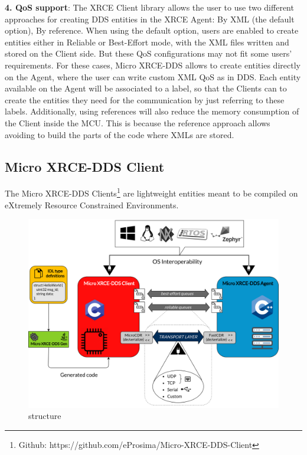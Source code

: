 \textbf{4. QoS support}: The XRCE Client library allows the user to use two different approaches for creating DDS entities in the XRCE Agent: By XML (the default option), By reference. When using the default option, users are enabled to create entities either in Reliable or Best-Effort mode, with the XML files written and stored on the Client side. But these QoS configurations may not fit some users’ requirements. For these cases, Micro XRCE-DDS allows to create entities directly on the Agent, where the user can write custom XML QoS as in DDS. Each entity available on the Agent will be associated to a label, so that the Clients can to create the entities they need for the communication by just referring to these labels. Additionally, using references will also reduce the memory consumption of the Client inside the MCU. This is because the reference approach allows avoiding to build the parts of the code where XMLs are stored.

\subsection{Micro XRCE-DDS Client}
The Micro XRCE-DDS Clients\footnote{Github: https://github.com/eProsima/Micro-XRCE-DDS-Client} are lightweight entities meant to be compiled on eXtremely Resource Constrained Environments.
\begin{figure}[htb!]
    \centering
    \includegraphics[width=0.95\linewidth]{Img/General.png}
    \caption{structure}\label{f:general}
    \vspace{-0.1in}
\end{figure}

